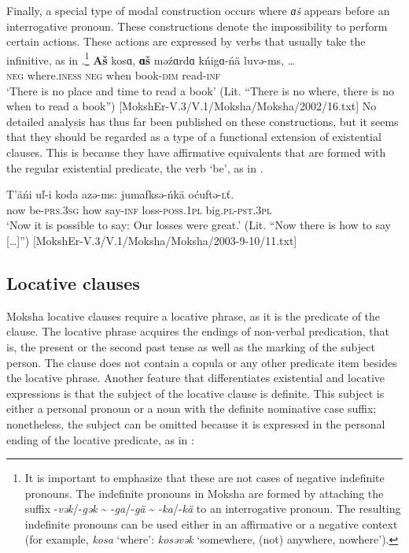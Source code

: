 \documentclass[output=paper]{langsci/langscibook}
\begin{document}
  Finally, a special type of modal construction occurs where \textit{ɑš} appears before an interrogative pronoun. These constructions denote the impossibility to perform certain actions. These actions are expressed by verbs that usually take the infinitive, as in .\footnote{It is important to emphasize that these are not cases of negative indefinite pronouns. The indefinite pronouns in Moksha are formed by attaching the suffix -\textit{vək}/-\textit{gək} {\textasciitilde} -\textit{ga}/-\textit{gä} {\textasciitilde} -\textit{ka}/-\textit{kä} to an interrogative pronoun. The resulting indefinite pronouns can be used either in an affirmative or a negative context (for example, \textit{kosa} `where': \textit{kosəvək} `somewhere, (not) anywhere, nowhere').} 
\ea\label{ex:moksha-book}
\gll \textbf{Aš} kosɑ, \textbf{ɑš} məźɑrdɑ kńigɑ-ńä luvə-ms,
\ob\ldots\cb\\
\textsc{neg}  where.\textsc{iness}  \textsc{neg}  when      book-\textsc{dim}    read-\textsc{inf}\\
\glt `There is no place and time to read a book' (Lit. ``There is no where, there is no when to read a book'') [MokshEr-V.3/V.1/Moksha/Moksha/2002/16.txt]
\z
No detailed analysis has thus far been published on these constructions, but it seems that they should be regarded as a type of a functional extension of existential clauses. This is because they have affirmative equivalents that are formed with the regular existential predicate, the verb `be', as in .

\ea\label{ex:moksha-loss}
\gll T’äńi uľ-i koda azə-ms: jumafksə-ńkä  oćuftə-\textsc{ľ}ť.\\
now be-\textsc{prs.3sg} how say-\textsc{inf} loss-\textsc{poss.1pl} big.\textsc{pl-pst.3pl}\\
\glt `Now it is possible to say: Our losses were great.' (Lit. ``Now there is how to say [\ldots]'') [MokshEr-V.3/V.1/Moksha/Moksha/2003-9-10/11.txt]
\z

\subsection{Locative clauses}\label{sec:2:5.3}

Moksha locative clauses require a locative phrase, as it is the predicate of the clause. The locative phrase acquires the endings of non-verbal predication, that is, the present or the second past tense as well as the marking of the subject person. The clause does not contain a copula or any other predicate item besides the locative phrase. Another feature that differentiates existential and locative expressions is that the subject of the locative clause is definite. This subject is either a personal pronoun or a noun with the definite nominative case suffix; nonetheless, the subject can be omitted because it is expressed in the personal ending of the locative predicate, as in :
\end{document}
